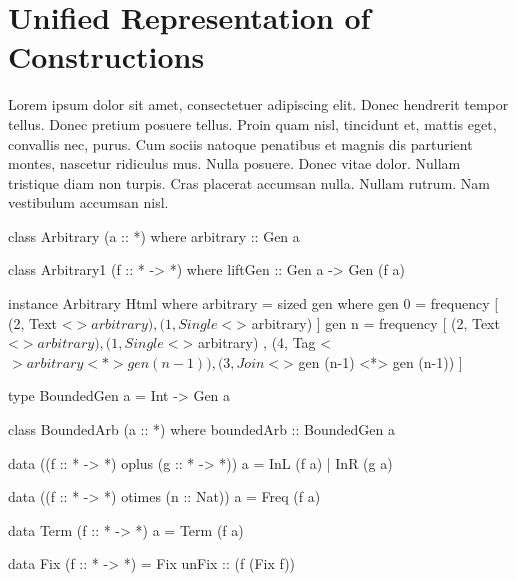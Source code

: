\section{Unified Representation of Constructions}
\label{sec:representation}

Lorem ipsum dolor sit amet, consectetuer adipiscing elit. Donec hendrerit tempor
tellus. Donec pretium posuere tellus. Proin quam nisl, tincidunt et, mattis
eget, convallis nec, purus. Cum sociis natoque penatibus et magnis dis
parturient montes, nascetur ridiculus mus. Nulla posuere. Donec vitae dolor.
Nullam tristique diam non turpis. Cras placerat accumsan nulla. Nullam rutrum.
Nam vestibulum accumsan nisl.

\begin{code}
class Arbitrary (a :: *) where
  arbitrary :: Gen a
\end{code}

\begin{code}
class Arbitrary1 (f :: * -> *) where
  liftGen :: Gen a -> Gen (f a)
\end{code}

\begin{code}
instance Arbitrary Html where
  arbitrary = sized gen
    where
      gen 0 = frequency
        [  (2,  Text    <$> arbitrary)
        ,  (1,  Single  <$> arbitrary) ]
      gen n = frequency
        [  (2,  Text    <$> arbitrary)
        ,  (1,  Single  <$> arbitrary)
        ,  (4,  Tag     <$> arbitrary  <*> gen (n-1))
        ,  (3,  Join    <$> gen (n-1)  <*> gen (n-1)) ]
\end{code} %

\begin{code}
type BoundedGen a = Int -> Gen a

class BoundedArb (a :: *) where
  boundedArb :: BoundedGen a
\end{code}

\begin{code}
data ((f :: * -> *) oplus (g :: * -> *)) a = InL (f a) | InR (g a)
\end{code}

\begin{code}
data ((f :: * -> *) otimes (n :: Nat)) a = Freq (f a)
\end{code}

\begin{code}
data Term (f :: * -> *) a = Term (f a)
\end{code}

\begin{code}
  data Fix (f :: * -> *) = Fix { unFix :: (f (Fix f)) }
\end{code}

